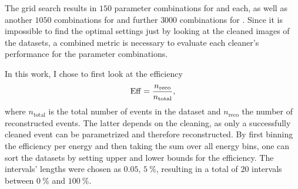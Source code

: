 
The grid search results in \(\num{150}\) parameter combinations for \tailcuts{} and \mars{} each,
as well as another \(\num{1050}\) combinations for \fact{} and further \(\num{3000}\) combinations for \tcc{}.
Since it is impossible to find the optimal settings just by looking at the
cleaned images of the datasets, a combined metric is necessary to evaluate each cleaner's performance
for the parameter combinations.

In this work, I chose to first look at the efficiency
\begin{equation}\label{eq:efficiency}
    \operatorname{Eff} =  \frac{n_{\mathrm{reco}}}{n_{\mathrm{total}}},
\end{equation}
where \(n_{\mathrm{total}}\) is the total number of events in the dataset and \(n_{\mathrm{reco}}\)
the number of reconstructed events. The latter depends on the cleaning, as only a successfully cleaned
event can be parametrized and therefore reconstructed. By first binning the efficiency per energy and then
taking the sum over all energy bins, one can sort the datasets by setting upper and lower bounds for the efficiency.
The intervals' lengths were chosen as \(\num{0.05}\), \ie \(\SI{5}{\percent}\), resulting in a total
of \(\num{20}\) intervals between \(\SI{0}{\percent}\) and \(\SI{100}{\percent}\).

